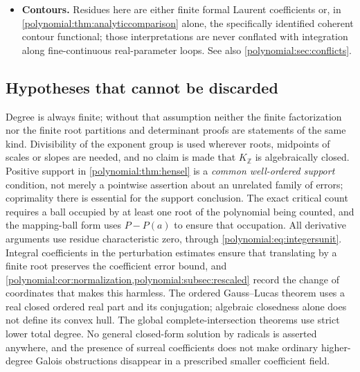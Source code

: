 \documentclass[11pt,letterpaper]{article}
\numberwithin{equation}{section}
\theoremstyle{definition}
\theoremstyle{remark}\newtheorem{remark}[theorem]{Remark}
\newcommand{\Z}{\mathbb Z}
\begin{document}
\begin{itemize}
inputs is well defined but not automatically computationally effective. A
support may have no supplied computable enumeration, and equality of arbitrary
surreal coefficients may have no finite decision procedure in the chosen
representation. Noetherianity of the analytic coefficient rings of the
supplied manuscripts is not asserted; see
\cref{polynomial:rem:nonnoetherian}.
\item \textbf{Contours.} Residues here are either finite formal Laurent
coefficients or, in \cref{polynomial:thm:analyticcomparison} alone, the
specifically identified coherent contour functional; those interpretations are
never conflated with integration along fine-continuous real-parameter loops.
See also \cref{polynomial:sec:conflicts}.
\end{itemize}

\subsection{Hypotheses that cannot be discarded}
Degree is always finite; without that assumption neither the finite
factorization nor the finite root partitions and determinant proofs are
statements of the same kind. Divisibility of the exponent group is used
wherever roots, midpoints of scales or slopes are needed, and no claim is made
that $K_\Z$ is algebraically closed. Positive support in
\cref{polynomial:thm:hensel} is a \emph{common well-ordered support}
condition, not merely a pointwise assertion about an unrelated family of
errors; coprimality there is essential for the support conclusion. The exact
critical count requires a ball occupied by at least one root of the polynomial
being counted, and the mapping-ball form uses $P-P(a)$ to ensure that
occupation. All derivative arguments use residue characteristic zero, through
\eqref{polynomial:eq:integersunit}. Integral coefficients in the perturbation
estimates ensure that translating by a finite root preserves the coefficient
error bound, and
\cref{polynomial:cor:normalization,polynomial:subsec:rescaled} record the
change of coordinates that makes this harmless. The ordered Gauss--Lucas
theorem uses a real closed ordered real part and its conjugation; algebraic
closedness alone does not define its convex hull. The global
complete-intersection theorems use strict lower total degree. No general
closed-form solution by radicals is asserted anywhere, and the presence of
surreal coefficients does not make ordinary higher-degree Galois obstructions
disappear in a prescribed smaller coefficient field.
\end{document}
